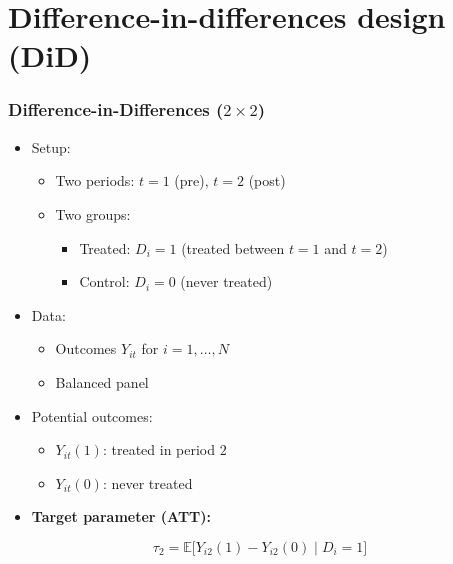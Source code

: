 \documentclass[12pt, compress]{beamer}
\begin{document}
\section{Difference-in-differences design (DiD)}
\begin{frame}
	\frametitle{Difference-in-Differences ($2 \times 2$)}

\begin{itemize}
	\item Setup:
	\begin{itemize}
		\item Two periods: $t = 1$ (pre), $t = 2$ (post)
		\item Two groups:
		\begin{itemize}
			\item Treated: $D_i = 1$ (treated between $t=1$ and $t=2$)
			\item Control: $D_i = 0$ (never treated)
		\end{itemize}
	\end{itemize}
	
	\medskip
	
	\item Data:
	\begin{itemize}
		\item Outcomes $Y_{it}$ for $i = 1,\dots,N$
		\item Balanced panel
	\end{itemize}
	
	\medskip
	
	\item Potential outcomes:
	\begin{itemize}
		\item $Y_{it}(1)$: treated in period $2$
		\item $Y_{it}(0)$: never treated
	\end{itemize}
	
	\medskip
	
	\item \textbf{Target parameter (ATT):}
\end{itemize}

\[
\tau_{2} = \mathbb{E}\big[ Y_{i2}(1) - Y_{i2}(0) \mid D_i = 1 \big]
\]

\end{frame}
\end{document}
